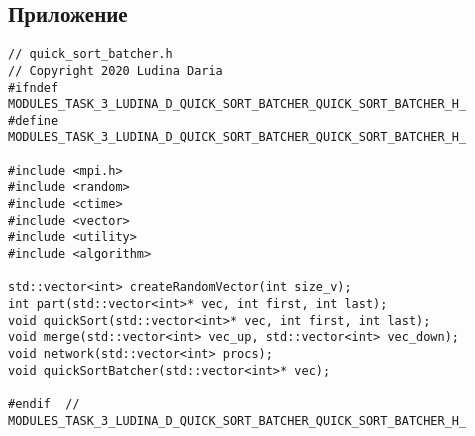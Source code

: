 \documentclass[a4paper]{report}
\begin{document}
\begin{center}
\section*{Приложение}
\end{center}
\begin{lstlisting}
// quick_sort_batcher.h
// Copyright 2020 Ludina Daria
#ifndef MODULES_TASK_3_LUDINA_D_QUICK_SORT_BATCHER_QUICK_SORT_BATCHER_H_
#define MODULES_TASK_3_LUDINA_D_QUICK_SORT_BATCHER_QUICK_SORT_BATCHER_H_

#include <mpi.h>
#include <random>
#include <ctime>
#include <vector>
#include <utility>
#include <algorithm>

std::vector<int> createRandomVector(int size_v);
int part(std::vector<int>* vec, int first, int last);
void quickSort(std::vector<int>* vec, int first, int last);
void merge(std::vector<int> vec_up, std::vector<int> vec_down);
void network(std::vector<int> procs);
void quickSortBatcher(std::vector<int>* vec);

#endif  // MODULES_TASK_3_LUDINA_D_QUICK_SORT_BATCHER_QUICK_SORT_BATCHER_H_
\end{lstlisting}
\end{document}
